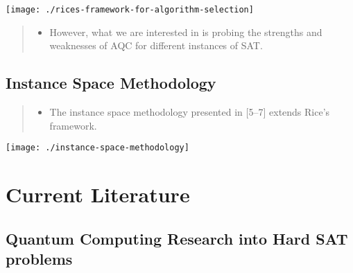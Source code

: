\documentclass[
]{article}
\providecommand{\tightlist}{%
  \setlength{\itemsep}{0pt}\setlength{\parskip}{0pt}}
\begin{document}
\begin{center}\texttt{[image: ./rices-framework-for-algorithm-selection]} \end{center}

\begin{quote}
\begin{itemize}
\tightlist
\item
  However, what we are interested in is probing the strengths and
  weaknesses of AQC for different instances of SAT.
\end{itemize}
\end{quote}

\hypertarget{instance-space-methodology}{%
\subsection{Instance Space
Methodology}\label{instance-space-methodology}}

\begin{quote}
\begin{itemize}
\tightlist
\item
  The instance space methodology presented in {[}5--7{]} extends Rice's
  framework. \pause
\end{itemize}
\end{quote}

\begin{center}\texttt{[image: ./instance-space-methodology]} \end{center}

\hypertarget{current-literature}{%
\section{Current Literature}\label{current-literature}}

\hypertarget{quantum-computing-research-into-hard-sat-problems}{%
\subsection{Quantum Computing Research into Hard SAT
problems}\label{quantum-computing-research-into-hard-sat-problems}}
\end{document}
